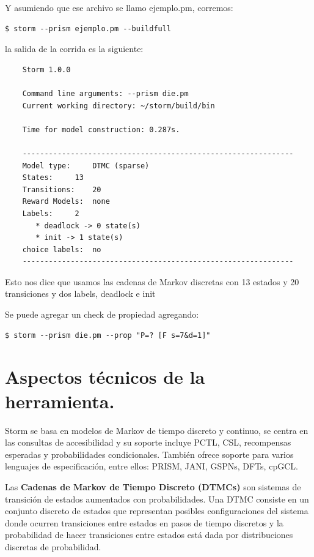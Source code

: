 \documentclass[11pt]{article}
\begin{document}
Y asumiendo que ese archivo se llamo ejemplo.pm, corremos:

\begin{verbatim}
$ storm --prism ejemplo.pm --buildfull
\end{verbatim}
					
la salida de la corrida es la siguiente:

\begin{verbatim}
	Storm 1.0.0

	Command line arguments: --prism die.pm
	Current working directory: ~/storm/build/bin
	
	Time for model construction: 0.287s.
	
	--------------------------------------------------------------
	Model type: 	DTMC (sparse)
	States: 	13
	Transitions: 	20
	Reward Models:  none
	Labels: 	2
	   * deadlock -> 0 state(s)
	   * init -> 1 state(s)
	choice labels: 	no
	--------------------------------------------------------------
\end{verbatim}

Esto nos dice que usamos las cadenas de Markov discretas con 13 estados y 20 transiciones y dos labels, deadlock e init

Se puede agregar un check de propiedad agregando:

\begin{verbatim}
$ storm --prism die.pm --prop "P=? [F s=7&d=1]"
\end{verbatim}


\section{Aspectos t\'ecnicos de la herramienta.}

Storm se basa en modelos de Markov de tiempo discreto y continuo, se centra en las consultas de accesibilidad y su soporte incluye PCTL, CSL, recompensas esperadas y probabilidades condicionales. Tambi\'en ofrece soporte para varios lenguajes de especificaci\'on, entre ellos: PRISM, JANI, GSPNs, DFTs, cpGCL.

Las \textbf{Cadenas de Markov de Tiempo Discreto (DTMCs)} son sistemas de transici\'on de estados aumentados con probabilidades. Una DTMC consiste en un conjunto discreto de estados que representan posibles configuraciones del sistema donde ocurren transiciones entre estados en pasos de tiempo discretos y la probabilidad de hacer transiciones entre estados est\'a dada por distribuciones discretas de probabilidad.
 
\end{document}
